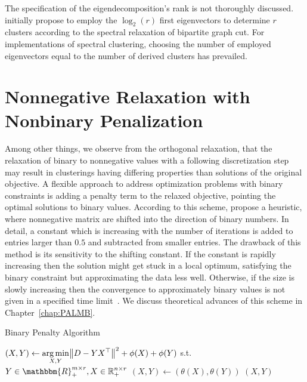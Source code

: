 The specification of the eigendecomposition's rank is not thoroughly discussed.  \cite{dhillon2001co} initially propose to employ the $\log_2(r)$ first eigenvectors to determine $r$ clusters according to the spectral relaxation of bipartite graph cut. For implementations of spectral clustering, choosing the number of employed eigenvectors equal to the number of derived clusters has prevailed.  
\section{Nonnegative Relaxation with Nonbinary Penalization}\label{sec:ZS:Penalty}
Among other things, we observe from the orthogonal relaxation, that the relaxation of binary to nonnegative values with a following discretization step may result in clusterings having differing properties than solutions of the original objective. A flexible approach to address optimization problems with binary constraints is adding a penalty term to the relaxed objective, pointing the optimal solutions to binary values.
According to this scheme, \cite{lazzeroni2002plaid} propose a heuristic, where nonnegative matrix are shifted into the direction of binary numbers. In detail, a constant which is increasing with the number of iterations is added to entries larger than $0.5$ and subtracted from smaller entries. The drawback of this method is its sensitivity to the shifting constant. If the constant is rapidly increasing then the solution might get stuck in a local optimum, satisfying the binary constraint but approximating the data less well. Otherwise, if the size is slowly increasing then the convergence to approximately binary values is not given in a specified time limit~\citep{turner2005improved}. We discuss theoretical advances of this scheme in Chapter~\ref{chap:PALMB}.
\begin{algorithm}[t]
\caption{Binary Penalty Algorithm} 
\begin{algorithmic}[1]
   
  \State $\displaystyle (X,Y)\gets \operatorname*{arg\,min}_{X,Y}\bigl\lVert D-YX^\top\bigr\rVert ^2 + \phi(X) + \phi(Y)$ s.t. $Y\in\mathbbm{R}_+^{m\times r}, X\in\mathbb{R}_+^{n\times r}$ \label{alg:binaryPenalty:opt}
  \State $(X,Y)\gets (\theta(X),\theta(Y))$
  \State \Return $(X,Y)$
  \EndFunction
\end{algorithmic}
\label{alg:binaryPenalty}
\end{algorithm}

